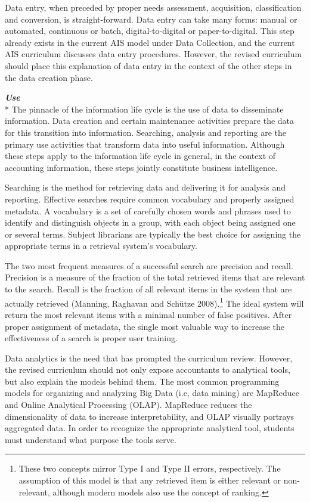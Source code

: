 \documentclass[12pt]{article}
\newcommand{\SubSubSection}[1]{{\centering{}\normalsize{}\textbf{\emph{#1}}}\\*\indent{}}
\begin{document}
Data entry, when preceded by proper needs assessment, acquisition, classification and conversion, is straight-forward. Data entry can take many forms: manual or automated, continuous or batch, digital-to-digital or paper-to-digital. This step already exists in the current AIS model under Data Collection, and the current AIS curriculum discusses data entry procedures. However, the revised curriculum should place this explanation of data entry in the context of the other steps in the data creation phase.

\SubSubSection{Use}
The pinnacle of the information life cycle is the use of data to disseminate information. Data creation and certain maintenance activities prepare the data for this transition into information. Searching, analysis and reporting are the primary use activities that transform data into useful information. Although these steps apply to the information life cycle in general, in the context of accounting information, these steps jointly constitute business intelligence.

Searching is the method for retrieving data and delivering it for analysis and reporting. Effective searches require common vocabulary and properly assigned metadata. A vocabulary is a set of carefully chosen words and phrases used to identify and distinguish objects in a group, with each object being assigned one or several terms. Subject librarians are typically the best choice for assigning the appropriate terms in a retrieval system's vocabulary.

The two most frequent measures of a successful search are precision and recall. Precision is a measure of the fraction of the total retrieved items that are relevant to the search. Recall is the fraction of all relevant items in the system that are actually retrieved (Manning, Raghavan and Sch\"utze 2008).\footnote{These two concepts mirror Type I and Type II errors, respectively. The assumption of this model is that any retrieved item is either relevant or non-relevant, although modern models also use the concept of ranking.} The ideal system will return the most relevant items with a minimal number of false positives. After proper assignment of metadata, the single most valuable way to increase the effectiveness of a search is proper user training.

Data analytics is the need that has prompted the curriculum review. However, the revised curriculum should not only expose accountants to analytical tools, but also explain the models behind them. The most common programming models for organizing and analyzing Big Data (i.e, data mining) are MapReduce and Online Analytical Processing (OLAP). MapReduce reduces the dimensionality of data to increase interpretability, and OLAP visually portrays aggregated data. In order to recognize the appropriate analytical tool, students must understand what purpose the tools serve.
\end{document}
